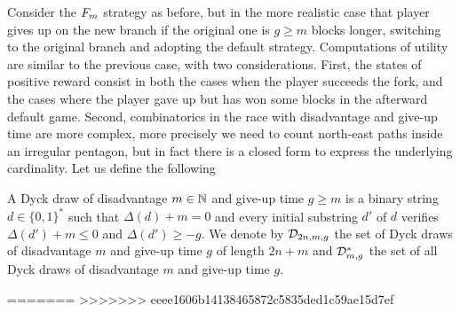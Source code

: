 Consider the $F_m$ strategy as before, but in the more realistic case that player gives up on the new branch if the original one is $g\geq m$ blocks longer, switching to the original branch and adopting the default strategy. Computations of utility are similar to the previous case, with two considerations. First, the states of positive reward consist in both the cases when the player succeeds the fork, and the cases where the player gave up but has won some blocks in the afterward default game. Second, combinatorics in the race with disadvantage and give-up time are more complex, more precisely we need to count north-east paths inside an irregular pentagon, but in fact there is a closed form to express the underlying cardinality. Let us define the following

\begin{mydef}
	A Dyck draw of disadvantage $m\in\mathbb{N}$ and give-up time $g\geq m$ is a binary string $d\in\{0,1\}^\ast$ such that $\Delta(d)+m=0$ and every initial substring $d'$ of $d$ verifies $\Delta(d')+m\leq 0$ and $\Delta(d')\geq -g$. We denote by $\mathcal{D}_{2n,m,g}$ the set of Dyck draws of disadvantage $m$ and give-up time $g$ of length $2n+m$ and $\mathcal{D}^\ast_{m,g}$ the set of all Dyck draws of disadvantage $m$ and give-up time $g$.
\end{mydef}

 

=======
>>>>>>> eeee1606b14138465872c5835ded1c59ae15d7ef
